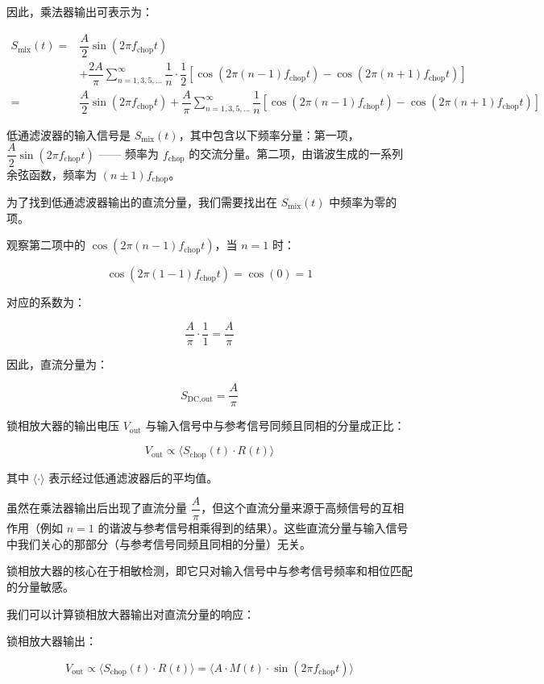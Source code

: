 因此，乘法器输出可表示为：

\[
\begin{aligned}
	S_{\text{mix}}(t) = & \dfrac{A}{2} \sin(2\pi f_{\text{chop}} t) \\
	& + \dfrac{2A}{\pi} \sum_{n=1,3,5,\dots}^{\infty} \dfrac{1}{n} \cdot \dfrac{1}{2} \left[ \cos(2\pi (n - 1) f_{\text{chop}} t) - \cos(2\pi (n + 1) f_{\text{chop}} t) \right] \\
	= & \dfrac{A}{2} \sin(2\pi f_{\text{chop}} t) + \dfrac{A}{\pi} \sum_{n=1,3,5,\dots}^{\infty} \dfrac{1}{n} \left[ \cos(2\pi (n - 1) f_{\text{chop}} t) - \cos(2\pi (n + 1) f_{\text{chop}} t) \right]
\end{aligned}
\]

低通滤波器的输入信号是 \( S_{\text{mix}}(t) \)，其中包含以下频率分量：第一项，\( \dfrac{A}{2} \sin(2\pi f_{\text{chop}} t) \) —— 频率为 \( f_{\text{chop}} \) 的交流分量。第二项，由谐波生成的一系列余弦函数，频率为 \( (n \pm 1) f_{\text{chop}} \)。

为了找到低通滤波器输出的直流分量，我们需要找出在 \( S_{\text{mix}}(t) \) 中频率为零的项。

观察第二项中的 \( \cos(2\pi (n - 1) f_{\text{chop}} t) \)，当 \( n = 1 \) 时：

\[
\cos(2\pi (1 - 1) f_{\text{chop}} t) = \cos(0) = 1
\]

对应的系数为：

\[
\dfrac{A}{\pi} \cdot \dfrac{1}{1} = \dfrac{A}{\pi}
\]

因此，直流分量为：

\[
S_{\text{DC,out}} = \dfrac{A}{\pi}
\]

锁相放大器的输出电压 \( V_{\text{out}} \) 与输入信号中与参考信号同频且同相的分量成正比：

\[
V_{\text{out}} \propto \langle S_{\text{chop}}(t) \cdot R(t) \rangle
\]

其中 \( \langle \cdot \rangle \) 表示经过低通滤波器后的平均值。

虽然在乘法器输出后出现了直流分量 \( \dfrac{A}{\pi} \)，但这个直流分量来源于高频信号的互相作用（例如 \( n = 1 \) 的谐波与参考信号相乘得到的结果）。这些直流分量与输入信号中我们关心的那部分（与参考信号同频且同相的分量）无关。

锁相放大器的核心在于相敏检测，即它只对输入信号中与参考信号频率和相位匹配的分量敏感。

我们可以计算锁相放大器输出对直流分量的响应：

锁相放大器输出：

\[
V_{\text{out}} \propto \langle S_{\text{chop}}(t) \cdot R(t) \rangle = \langle A \cdot M(t) \cdot \sin(2\pi f_{\text{chop}} t) \rangle
\]

